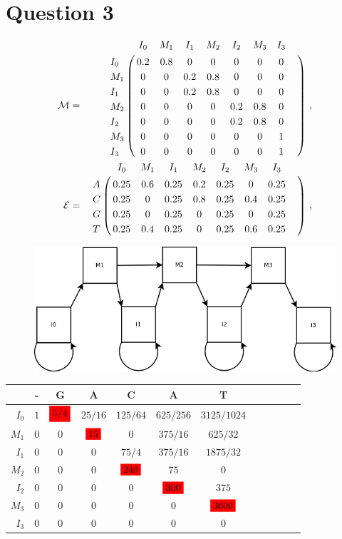 \documentclass[a4paper,11pt]{article}
\begin{document}
\section*{Question 3}

\begin{eqnarray*}
\mathcal{M}&=&\bordermatrix{
    &I_0&M_1&I_1&M_2&I_2&M_3&I_3&\cr
 I_0&0.2&0.8&0  &0  &0  &0  &0  \cr
 M_1&0  &0  &0.2&0.8&0  &0  &0  \cr
 I_1&0  &0  &0.2&0.8&0  &0  &0  \cr
 M_2&0  &0  &0  &0  &0.2&0.8&0  \cr
 I_2&0  &0  &0  &0  &0.2&0.8&0  \cr
 M_3&0  &0  &0  &0  &0  &0  &1\cr
 I_3&0  &0  &0  &0  &0  &0  &1}~,\\
\mathcal{E}&=&\bordermatrix{
&I_0&M_1&I_1&M_2&I_2&M_3&I_3&\cr
A&0.25&0.6&0.25&0.2&0.25&0  &0.25\cr
C&0.25&0  &0.25&0.8&0.25&0.4&0.25\cr
G&0.25&0  &0.25&0  &0.25&0  &0.25\cr
T&0.25&0.4&0.25&0  &0.25&0.6&0.25}~,
\end{eqnarray*}

\begin{figure}[h]
\centering\includegraphics[scale=.5]{HMM.png}
\end{figure}

\begin{table}[ht]
  \begin{center}
    \begin{tabular}{rccccccccccc}
      \toprule
      & - & G & A & C & A & T \\
      \midrule
      $I_0$&$1$&$\colorbox{red}{5/4}$&$25/16$&$125/64$&$625/256$&$3125/1024$\\
      $M_1$&$0$&$0  $&$\colorbox{red}{15}$&$0     $&$375/16 $&$625/32   $\\
      $I_1$&$0$&$0  $&$0    $&$75/4  $&$375/16 $&$1875/32  $\\
      $M_2$&$0$&$0  $&$0    $&$\colorbox{red}{240}$&$75     $&$0        $\\
      $I_2$&$0$&$0  $&$0    $&$0     $&$\colorbox{red}{300}$&$375      $\\
      $M_3$&$0$&$0  $&$0    $&$0     $&$0      $&$ \colorbox{red}{3600}$\\
      $I_3$&$0$&$0  $&$0    $&$0     $&$0      $&$0        $\\
      \bottomrule
    \end{tabular}
  \end{center}
\end{table}
\end{document}
